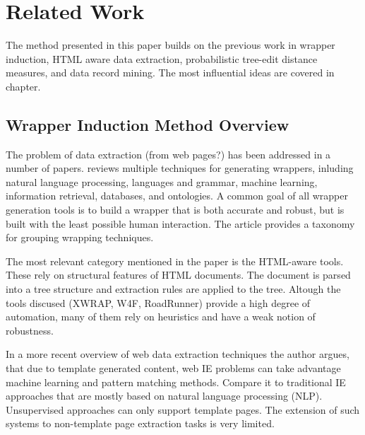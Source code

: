 \chapter{Related Work}
\label{ch:related-work}




The method presented in this paper builds on the previous work in wrapper induction, HTML aware data extraction, probabilistic tree-edit distance measures, and data record mining. The most influential ideas are covered in chapter.


\section{Wrapper Induction Method Overview}

The problem of data extraction (from web pages?) has been addressed in a number of papers. \cite{Laender:2002:BSW:565117.565137} reviews multiple techniques for generating wrappers, inluding natural language processing, languages and grammar, machine learning, information retrieval, databases, and ontologies. A common goal of all wrapper generation tools is to build a wrapper that is both accurate and robust, but is built with the least possible human interaction. The article provides a taxonomy for grouping wrapping techniques.

The most relevant category mentioned in the paper is the HTML-aware tools. These rely on structural features of HTML documents. The document is parsed into a tree structure and extraction rules are applied to the tree. Altough the tools discused (XWRAP, W4F, RoadRunner) provide a high degree of automation, many of them rely on heuristics and have a weak notion of robustness.

In a more recent overview of web data extraction techniques \cite{Chang:2006:SWI:1159162.1159300} the author argues, that due to template generated content, web IE problems can take advantage machine learning and pattern matching methods. Compare it to traditional IE approaches that are mostly based on natural language processing (NLP). Unsupervised approaches can only support template pages. The extension of such systems to non-template page extraction tasks is very limited.

